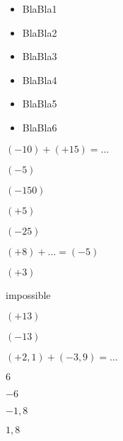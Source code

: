 \begin{acquis}
\begin{itemize}
\item BlaBla1
\item BlaBla2
\item BlaBla3
\item BlaBla4
\item BlaBla5
\item BlaBla6
\end{itemize}
\end{acquis}


\begin{QCM}
  \begin{GroupeQCM}
    \begin{exercice}
      $(- 10) + (+ 15) = \ldots$
      \begin{ChoixQCM}{4}
      \item $(- 5)$
      \item $(- 150)$
      \item $(+ 5)$
      \item $(- 25)$
      \end{ChoixQCM}
\begin{corrige}
   \end{corrige}
    \end{exercice}
    
    
    \begin{exercice}
      $(+ 8) + \ldots = (- 5)$
      \begin{ChoixQCM}{4}
      \item $(+ 3)$
      \item impossible
      \item $(+ 13)$
      \item $(- 13)$
      \end{ChoixQCM}
\begin{corrige}
   \end{corrige}
    \end{exercice}


    \begin{exercice}
      $(+ 2,1) + (- 3,9) = \ldots$
      \begin{ChoixQCM}{4}
      \item $6$
      \item $- 6$
      \item $- 1,8$
      \item $1,8$
      \end{ChoixQCM}
\begin{corrige}
   \end{corrige}
    \end{exercice}



\end{GroupeQCM}
\end{QCM}
